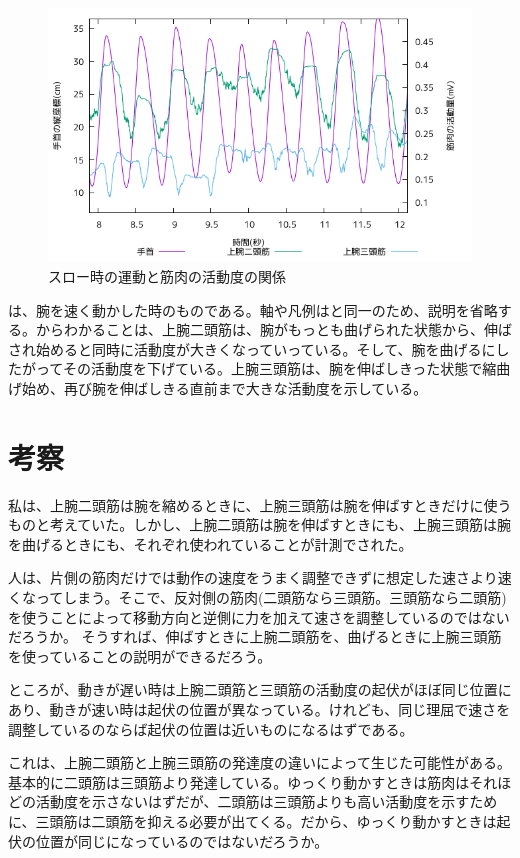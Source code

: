 \documentclass{jsarticle}
\begin{document}
\newpage
\begin{figure}[h]
  \begin{center}
    \includegraphics[width=15cm]{images/s2proto.png}
  \end{center}
  \caption{スロー時の運動と筋肉の活動度の関係}
  \label{fastfig}
\end{figure}
\label{fastfig}は、腕を速く動かした時のものである。軸や凡例は\label{slowfig}と同一のため、説明を省略する。\label{fastfig}からわかることは、上腕二頭筋は、腕がもっとも曲げられた状態から、伸ばされ始めると同時に活動度が大きくなっていっている。そして、腕を曲げるにしたがってその活動度を下げている。上腕三頭筋は、腕を伸ばしきった状態で縮曲げ始め、再び腕を伸ばしきる直前まで大きな活動度を示している。
\section{考察}
私は、上腕二頭筋は腕を縮めるときに、上腕三頭筋は腕を伸ばすときだけに使うものと考えていた。しかし、上腕二頭筋は腕を伸ばすときにも、上腕三頭筋は腕を曲げるときにも、それぞれ使われていることが計測でされた。

人は、片側の筋肉だけでは動作の速度をうまく調整できずに想定した速さより速くなってしまう。そこで、反対側の筋肉(二頭筋なら三頭筋。三頭筋なら二頭筋)を使うことによって移動方向と逆側に力を加えて速さを調整しているのではないだろうか。
そうすれば、伸ばすときに上腕二頭筋を、曲げるときに上腕三頭筋を使っていることの説明ができるだろう。

ところが、動きが遅い時は上腕二頭筋と三頭筋の活動度の起伏がほぼ同じ位置にあり、動きが速い時は起伏の位置が異なっている。けれども、同じ理屈で速さを調整しているのならば起伏の位置は近いものになるはずである。

これは、上腕二頭筋と上腕三頭筋の発達度の違いによって生じた可能性がある。基本的に二頭筋は三頭筋より発達している。ゆっくり動かすときは筋肉はそれほどの活動度を示さないはずだが、二頭筋は三頭筋よりも高い活動度を示すために、三頭筋は二頭筋を抑える必要が出てくる。だから、ゆっくり動かすときは起伏の位置が同じになっているのではないだろうか。
\end{document}
